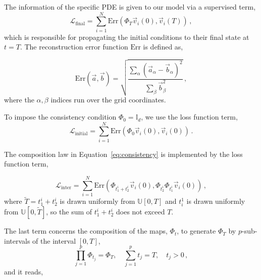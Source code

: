 \documentclass{article}
\theoremstyle{plain}
\theoremstyle{definition}
\theoremstyle{remark}
\newcommand{\rmse}{\text{Err}}
\begin{document}
The information of the specific PDE is given to our model via a supervised term, 
\begin{equation}
    \mathcal{L}_{\text{final}} = \sum_{i=1}^N\rmse\left( \Phi_T \vec{v}_i\left(0\right) ,\vec{v}_i\left(T\right) \right)  \,,
    \label{eq:Lfinal}
\end{equation}
which is responsible for propagating the initial conditions to their final state at $t=T$. The reconstruction error function $\rmse$ is defined as,

\begin{equation}
    \rmse\left(\vec{a},\vec{b}\right) = \sqrt{\frac{\sum_\alpha\left(\vec{a}_\alpha - \vec{b}_\alpha \right)^2}{\sum_\beta \vec{b}_\beta^2}} \,,
\end{equation}
where the $\alpha,\beta$ indices run over the grid coordinates.

To impose the consistency condition
$\Phi_0 = {\mathbb I}_d$, we use the loss function term,
\begin{equation}
    \mathcal{L}_{\text{initial}} = \sum_{i=1}^N\rmse\left( \Phi_0 \vec{v}_i\left(0\right) ,\vec{v}_i\left(0\right) \right)  \,.
    \label{eq:Linitial}
\end{equation}


The composition law in Equation~\eqref{eq:consistency} is implemented by the loss function term,

\begin{equation}
       \mathcal{L}_{\text{inter}} = \sum_{i=1}^N\rmse\left(\Phi_{t^i_1+t^i_2} \vec{v}_i\left(0\right) , \Phi_{t^i_2}\Phi_{t^i_1}\vec{v}_i\left(0\right)\right) \,,
       \label{eq:Linter}
\end{equation}
where $\tilde T =t^i_1 +t^i_2$ is drawn uniformly from $\mathbb{U}[0,T]$ and $t^1_i$ is drawn uniformly from $\mathbb{U}[0,\tilde T]$, so the sum of  $t^i_1 +t^i_2$ does not exceed $T$.


The last term concerns the composition of the maps, $\Phi_t$, to generate $\Phi_T$
by $p$-sub-intervals of the interval $\left[0,T \right]$,
\begin{equation}
\prod_{j=1}^p \Phi_{t_j} = \Phi_T,\quad \sum_{j=1}^{p}t_j = T ,\quad
t_j > 0\,,
    \label{eq:par}
\end{equation}
and it reads,
\end{document}
